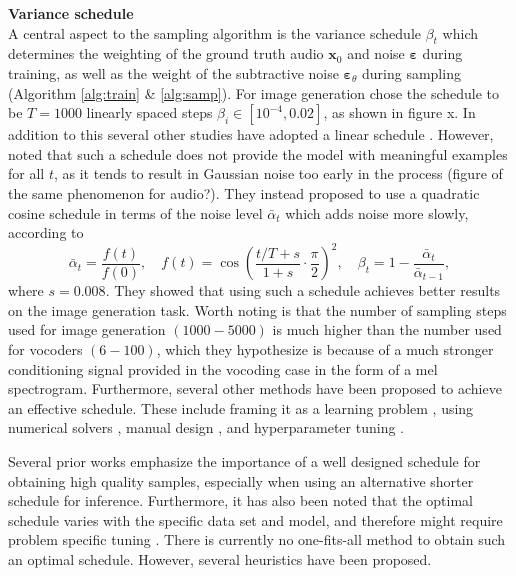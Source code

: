 \documentclass{article}
\begin{document}
\textbf{Variance schedule} \\
A central aspect to the sampling algorithm is the variance schedule $\beta_t$ which determines the weighting of the ground truth audio $\bm{x}_0$ and noise $\bm{\varepsilon}$ during training, as well as the weight of the subtractive noise $\bm{\varepsilon}_{\theta}$ during sampling (Algorithm \ref{alg:train} \& \ref{alg:samp}). For image generation \cite{ho2020denoising} chose the schedule to be $T=1000$ linearly spaced steps $\beta_i \in [10^{-4}, 0.02]$, as shown in figure x. In addition to this several other studies have adopted a linear schedule \cite{kong2020diffwave, lee2021priorgrad}. However, \cite{nichol2021improved} noted that such a schedule does not provide the model with meaningful examples for all $t$, as it tends to result in Gaussian noise too early in the process (figure of the same phenomenon for audio?). They instead proposed to use a quadratic cosine schedule in terms of the noise level $\bar{\alpha}_t$ which adds noise more slowly, according to
\begin{equation} \label{eq:cos}
    \bar{\alpha}_t = \frac{f(t)}{f(0)}, \quad f(t) = \cos\left( \frac{t/T + s}{ 1+ s}\cdot \frac{\pi}{2} \right)^2, \quad \beta_t = 1 - \frac{\bar{\alpha}_t}{\bar{\alpha}_{t-1}},
\end{equation}
where $s = 0.008$. They showed that using such a schedule achieves better results on the image generation task. Worth noting is that the number of sampling steps used for image generation $(1000 - 5000)$ is much higher than the number used for vocoders $(6 - 100)$, which they hypothesize is because of a much stronger conditioning signal provided in the vocoding case in the form of a mel spectrogram. Furthermore, several other methods have been proposed to achieve an effective schedule. These include framing it as a learning problem \cite{watson2021learning, lam2022bddm}, using numerical solvers \cite{jolicoeur2021gotta}, manual design \cite{chen2020wavegrad}, and hyperparameter tuning \cite{chen2022infergrad}. 

Several prior works emphasize the importance of a well designed schedule for obtaining high quality samples, especially when using an alternative shorter schedule for inference. Furthermore, it has also been noted that the optimal schedule varies with the specific data set and model, and therefore might require problem specific tuning \cite{lam2022bddm, chen2020wavegrad}. There is currently no one-fits-all method to obtain such an optimal schedule. However, several heuristics have been proposed. 
\end{document}
